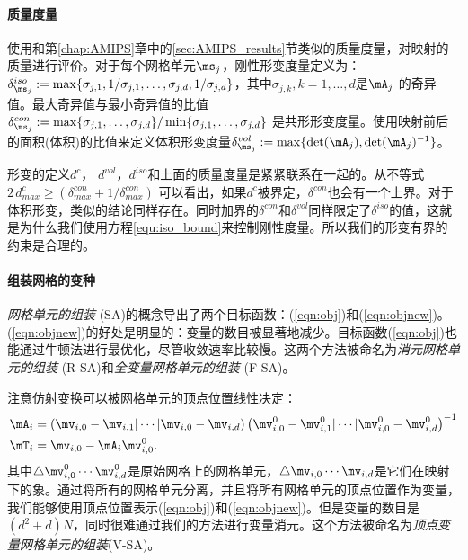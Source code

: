 \paragraph{质量度量}
使用和第\ref{chap:AMIPS}章中的\ref{sec:AMIPS_results}节类似的质量度量，对映射的质量进行评价。对于每个网格单元$\ms_j$，刚性形变度量定义为：$\delta^{iso}_{\ms_j}:= \max \{\sigma_{j,1}, 1/\sigma_{j,1},\ldots, \sigma_{j,d}, 1/\sigma_{j,d}\}$，其中$\sigma_{j,k}, k=1,\ldots,d$是$\mA_{j}$ 的奇异值。最大奇异值与最小奇异值的比值$\delta^{con}_{\ms_j}:= \max\{\sigma_{j,1},\ldots,\sigma_{j,d}\} / \min\{\sigma_{j,1},\ldots,\sigma_{j,d}\}$ 是共形形变度量。使用映射前后的面积(体积)的比值来定义体积形变度量$\delta^{vol}_{\ms_j} := \max\{\det(\mA_{j}), \det(\mA_{j})^{-1}\}$。

形变的定义$d^c$， $d^{vol}$，$d^{iso}$和上面的质量度量是紧紧联系在一起的。从不等式$ 2 \, d^c_{max} \geq (\delta^{con}_{max} + 1/\delta^{con}_{max})$ 可以看出，如果$d^c$被界定，$\delta^{con}$也会有一个上界。对于体积形变，类似的结论同样存在。同时加界的$\delta^{con}$和$\delta^{vol}$同样限定了$\delta^{iso}$的值，这就是为什么我们使用方程\ref{equ:iso_bound}来控制刚性度量。所以我们的形变有界的约束是合理的。

\paragraph{组装网格的变种}
\emph{网格单元的组装} (SA)的概念导出了两个目标函数：(\ref{eqn:obj})和(\ref{eqn:objnew})。(\ref{eqn:objnew})的好处是明显的：变量的数目被显著地减少。目标函数(\ref{eqn:obj})也能通过牛顿法进行最优化，尽管收敛速率比较慢。这两个方法被命名为\emph{消元网格单元的组装} (R-SA)和\emph{全变量网格单元的组装} (F-SA)。

注意仿射变换可以被网格单元的顶点位置线性决定：
\begin{align}
\mA_i &= \left(\mv_{i,0}-\mv_{i,1} | \cdots | \mv_{i,0}-\mv_{i,d}\right)\left(\mv^0_{i,0}-\mv^0_{i,1} | \cdots | \mv^0_{i,0}-\mv^0_{i,d}\right)^{-1} \\
\mT_i &= \mv_{i,0} - \mA_i \mv^0_{i,0}.
\end{align}
其中$\triangle \mv^0_{i,0}\cdots\mv^0_{i,d}$是原始网格上的网格单元，$\triangle \mv_{i,0}\cdots\mv_{i,d}$是它们在映射下的象。通过将所有的网格单元分离，并且将所有网格单元的顶点位置作为变量，我们能够使用顶点位置表示(\ref{eqn:obj})和(\ref{eqn:objnew})。但是变量的数目是$(d^2+d)N$，同时很难通过我们的方法进行变量消元。这个方法被命名为\emph{顶点变量网格单元的组装}(V-SA)。

